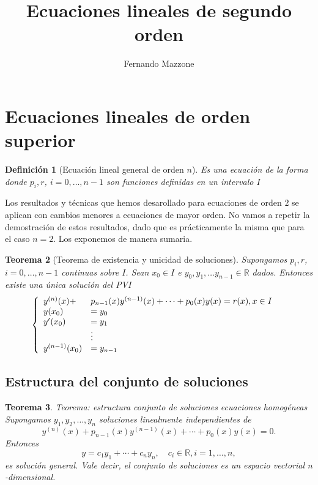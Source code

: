 \documentclass{article}
\title{Ecuaciones lineales de segundo orden}
\author{Fernando Mazzone}
\newcommand{\rr}{\mathbb{R}}
\newtheorem{teorema}{Teorema}[section]
\newtheorem{definicion}[teorema]{Definici\'on}
\begin{document}
\section{Ecuaciones lineales de orden superior}

\begin{definicion}[Ecuación lineal general de orden $n$]

Es una ecuación de la forma
donde $p_i,r$, $i=0,\ldots,n-1$ son funciones definidas en un intervalo $I$
\end{definicion}


Los resultados y técnicas que hemos desarollado para ecuaciones de orden $2$ se aplican con cambios menores a ecuaciones de mayor orden. No vamos a repetir la demostración de estos resultados, dado que es prácticamente la misma que para el caso $n=2$. Los exponemos de manera sumaria.


\begin{teorema}[Teorema de existencia y unicidad de soluciones]
 Supongamos $p_i,r$, $i=0,\ldots,n-1$ continuas sobre $I$. Sean $x_0\in I$ e $y_0,y_1,\ldots y_{n-1}\in\rr$ dados. Entonces existe una única solución del PVI
 \[\left\{
 \begin{array}{l l l}
   y^{(n)}(x)+&p_{n-1}(x)y^{(n-1)}(x)+\cdots+p_0(x)y(x)=r(x),x\in I\\
   y(x_0)&=y_0&\\
   y'(x_0)&=y_1&\\
   &\vdots\\
  y^{(n-1)}(x_0)&=y_{n-1}&\\
  \end{array}\right.
\]
\end{teorema}


\subsection{Estructura del conjunto de soluciones}

\begin{teorema}{Teorema: estructura conjunto de soluciones ecuaciones homogéneas}
Supongamos $y_1,y_2,\ldots,y_n$ soluciones linealmente independientes de 
\[y^{(n)}(x)+p_{n-1}(x)y^{(n-1)}(x)+\cdots+p_0(x)y(x)=0.\]
Entonces 
\[y=c_1y_1+\cdots+c_ny_n,\quad c_i\in\rr, i=1,\ldots,n,\]
es solución general. Vale decir, el conjunto de soluciones es un espacio vectorial $n$-dimensional.
\end{teorema}
\end{document}
